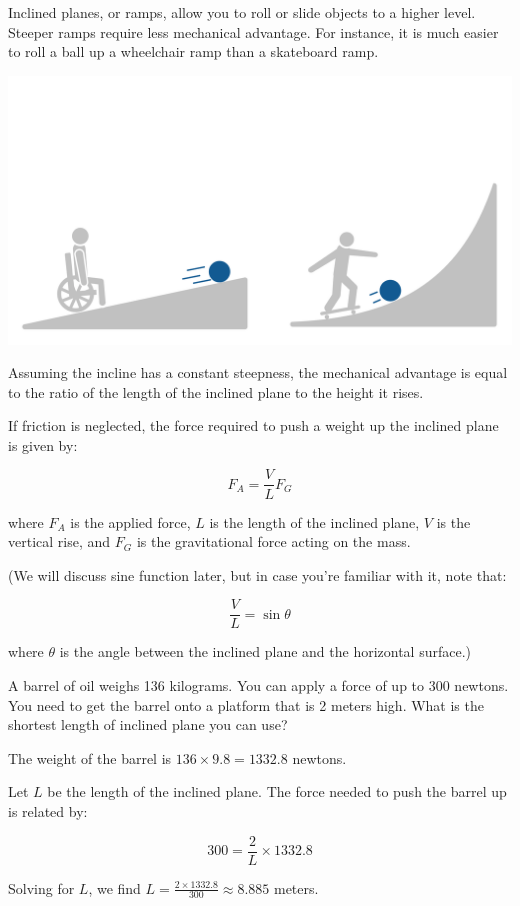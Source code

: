 Inclined planes, or ramps, allow you to roll or slide objects to a higher level. Steeper ramps require less mechanical advantage. For instance, it is much easier to roll a ball up a wheelchair ramp than a skateboard ramp.

\includegraphics[width=\textwidth]{rampcomparison.png}

Assuming the incline has a constant steepness, the mechanical advantage is equal to the ratio of the length of the inclined plane to the height it rises.

If friction is neglected, the force required to push a weight up the inclined plane is given by:

\[
F_A = \frac{V}{L} F_G
\]

where \( F_A \) is the applied force, \( L \) is the length of the inclined plane, \( V \) is the vertical rise, and \( F_G \) is the gravitational force acting on the mass.

(We will discuss sine function later, but in case you're familiar with it, note that:

\[
\frac{V}{L} = \sin{\theta}
\]

where \( \theta \) is the angle between the inclined plane and the horizontal surface.)

\begin{Exercise}[title={Ramp}, label=ramp]
A barrel of oil weighs 136 kilograms. You can apply a force of up to 300 newtons. You need to get the barrel onto a platform that is 2 meters high. What is the shortest length of inclined plane you can use?
\end{Exercise}
\begin{Answer}[ref=ramp]
The weight of the barrel is \( 136 \times 9.8 = 1332.8 \) newtons.

Let \( L \) be the length of the inclined plane. The force needed to push the barrel up is related by:

\[
300 = \frac{2}{L} \times 1332.8
\]

Solving for \( L \), we find \( L = \frac{2 \times 1332.8}{300} \approx 8.885 \) meters.
\end{Answer}

